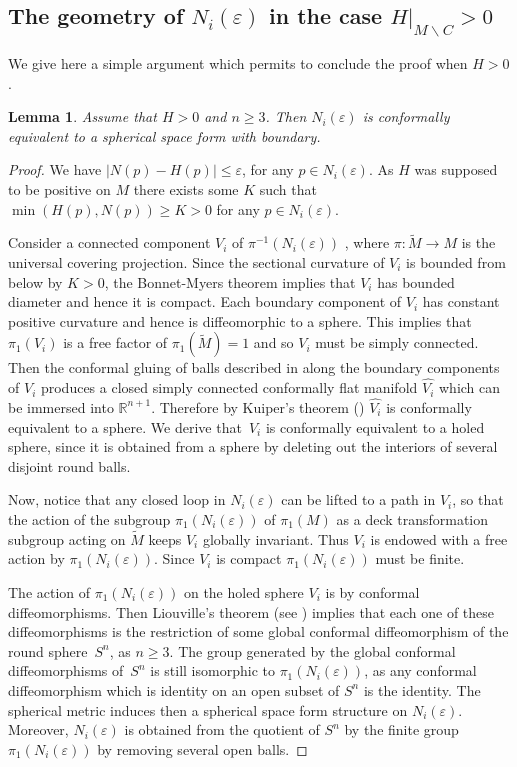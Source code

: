 \documentclass[10pt]{amsart}
\let\moins\smallsetminus
\newtheorem{lemma}[theorem]{Lemma}
\theoremstyle{definition}
\theoremstyle{remark}
\numberwithin{equation}{section}
\begin{document}
\subsection{The geometry of $N_i(\varepsilon)$ in the case $H|_{M\moins C}>0$}
We give here a simple argument which permits to conclude the proof when $H>0$.
\begin{lemma}
Assume that $H >0$ and $n\geq3$. Then $N_i(\varepsilon)$ is conformally equivalent
to a spherical space form with boundary.
\end{lemma}
\begin{proof}
We have $|N(p)-H(p)| \leq \varepsilon$, for
any $p\in N_i(\varepsilon)$.
As $H$ was supposed to be positive on $M$ there exists some $K$
such that $\min(H(p), N(p)) \geq K > 0$ for any $p\in N_i(\varepsilon)$.

Consider a connected component $V_i$ of $\pi^{-1}(N_i(\varepsilon))$ ,
where $\pi:\widetilde{M}\to M$ is
the universal covering projection.
Since the sectional curvature of $V_i$ is bounded from
below by $K >0$, the Bonnet-Myers theorem implies that
$V_i$ has bounded diameter and hence it is
compact. Each boundary component of $V_i$ has constant positive curvature and hence
is diffeomorphic to a sphere.
This implies that $\pi_1(V_i)$ is a free factor of $\pi_1(\widetilde{M})=1$
and so $V_i$ must be simply connected.
Then the conformal gluing of balls
described in \cite[\S2]{Pi} along the boundary components
of $V_i$ produces a closed simply connected conformally flat manifold
$\widehat{V_i}$ which can be immersed into $\mathbb R^{n+1}$.
Therefore by Kuiper's theorem (\cite{Ku1}) $\widehat{V_i}$ is conformally equivalent to a sphere.
We derive that~$V_i$ is conformally equivalent to a holed sphere, since it is obtained from a sphere
by deleting out the interiors of several disjoint round balls.

Now, notice that any closed loop in $N_i(\varepsilon)$ can be lifted
to a path in $V_i$, so that the action of the subgroup
$\pi_1(N_i(\varepsilon))$ of $\pi_1(M)$ as a deck transformation subgroup
acting on $\widetilde{M}$ keeps $V_i$ globally invariant.
Thus $V_i$ is endowed with a free action by $\pi_1(N_i(\varepsilon))$.
Since $V_i$ is compact $\pi_1(N_i(\varepsilon))$ must be finite.

The action of $\pi_1(N_i(\varepsilon))$ on the holed sphere
$V_i$ is by conformal diffeomorphisms. Then Liouville's theorem (see \cite[Th.\,3.1]{Kul3}) implies
that each one of these diffeomorphisms is the restriction of some global conformal diffeomorphism
of the round sphere~$S^{n}$, as $n\geq3$. The group generated by the global conformal diffeomorphisms of~$S^n$ is still isomorphic to $\pi_1(N_i(\varepsilon))$, as any conformal diffeomorphism which is identity on an open subset of $S^n$
is the identity. The spherical metric induces then a spherical space form structure on $N_i(\varepsilon)$.
Moreover, $N_i(\varepsilon)$ is obtained from the quotient of $S^n$ by the finite group $\pi_1(N_i(\varepsilon))$
by removing several open balls.
\end{proof}
\end{document}
